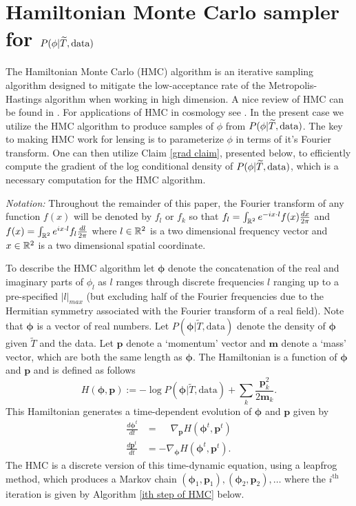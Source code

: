 \documentclass[iop,revtex4,apj,onecolumn]{emulateapj}
\newcommand{\bs}{\boldsymbol}
\begin{document}
%
%
\section{Hamiltonian Monte Carlo sampler for $P(\phi | \widetilde T,  \text{\rm data})$}
\label{Section: hamiltonian sampler section}


The Hamiltonian Monte Carlo (HMC) algorithm is an iterative sampling algorithm designed to mitigate the low-acceptance rate of the Metropolis-Hastings algorithm when working in high dimension. 
A nice review of HMC can be found in \cite{neal2011mcmc}. For applications of HMC in cosmology see \cite{PhysRevD.75.083525, taylor2008fast, elsner2010local, 2010MNRAS.409..355J, 2012MNRAS.425.1042J, jasche2013bayesian, jasche2013methods}. In the present case we utilize the HMC algorithm to produce samples of $\phi$ from $P(\phi | \widetilde T,  \text{\rm data})$.  The key to making HMC work for lensing is to parameterize  $\phi$ in terms of it's Fourier transform. One can then utilize  Claim \ref{grad claim}, presented below, to efficiently compute the gradient of the log conditional density of $P(\phi | \widetilde T,  \text{\rm data})$, which is a necessary computation for the HMC algorithm.

{\em Notation:} Throughout the remainder of this paper, the Fourier transform of any function $f(x)$ will be denoted by $f_l$ or $f_k$ so that $f_l  =  \int_{\Bbb R^2} e^{-i x\cdot l}  f(x)\frac{dx}{2\pi}$ and
$f(x) =  \int_{\Bbb R^2} e^{i x\cdot l}  f_l \frac{dl}{2\pi}$ 
where $l\in \Bbb R^2$ is a two dimensional frequency vector and $x\in \Bbb R^2$  is a two dimensional spatial coordinate.


To describe the HMC algorithm let $\bs \phi$ denote the concatenation of the real and imaginary parts of $\phi_l$ as $l$ ranges through discrete frequencies $l$ ranging up to a pre-specified $|l|_{max}$ (but excluding  half of the Fourier frequencies due to the Hermitian symmetry associated with the Fourier transform of a real field). Note that $\bs \phi$ is a vector of real numbers. 
Let $P(\bs \phi|\widetilde T, \text{data})$ denote the density of $\bs \phi$ given $\widetilde T$ and the data. 
Let $\bs p$ denote a `momentum' vector and $\bs m$ denote a `mass' vector, which are both the same length as $\bs \phi$. The Hamiltonian is a function of $\bs \phi$ and $\bs p$ and is defined as follows
\[ H(\bs \phi, \bs p):= -\log P(\bs \phi|\widetilde T, \text{data})+\sum_k \frac{\bs p_k^2}{2\bs m_k}. \]
This Hamiltonian generates a time-dependent evolution of $\bs \phi$ and $\bs p$ given by 
\begin{align*}
\frac{d\bs \phi^t}{dt} &= \phantom{-}\nabla_{\bs p} H(\bs \phi^t, \bs p^t) \\
\frac{d\bs p^t}{dt}    &= -\nabla_{\bs \phi} H(\bs \phi^t, \bs p^t).
\end{align*} 
The HMC is a discrete version of  this time-dynamic equation, using a leapfrog method, which produces a Markov chain $(\bs \phi_1, \bs p_1), (\bs \phi_2, \bs p_2), \ldots$ where the $i^\text{th}$ iteration is given by Algorithm \ref{ith step of HMC} below.
\end{document}
